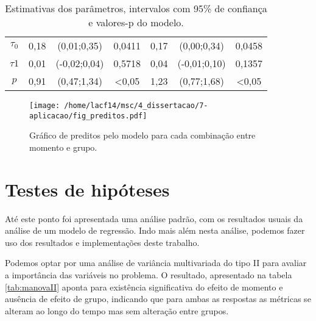 \begin{table}[H]
\begin{tabular}{c|cccccc}
$\tau_0$                   & 0,18       & (0,01;0,35)                                                       & \multicolumn{1}{c|}{0,0411} & 0,17       & (0,00;0,34)                                                       & 0,0458           \\
$\tau1$                    & 0,01       & (-0,02;0,04)                                                      & \multicolumn{1}{c|}{0,5718}           & 0,04       & (-0,01;0,10)                                                      & 0,1357           \\
$p$                        & 0,91       & (0,47;1,34)                                                       & \multicolumn{1}{c|}{\textless 0,05} & 1,23       & (0,77;1,68)                                                       & \textless 0,05 \\ \hline
\end{tabular}
\caption{Estimativas dos parâmetros, intervalos com 95\% de confiança e valores-p do modelo.}
\label{tab:estimativas}
\end{table}

\begin{figure}[H]
\centering
\texttt{[image: /home/lacf14/msc/4\_dissertacao/7-aplicacao/fig\_preditos.pdf]}
\caption{Gráfico de preditos pelo modelo para cada combinação entre momento e grupo.}
\label{fig:preds}
\end{figure}


\section{Testes de hipóteses}

Até este ponto foi apresentada uma análise padrão, com os resultados usuais da análise de um modelo de regressão. Indo mais além nesta análise, podemos fazer uso dos resultados e implementações deste trabalho.

Podemos optar por uma análise de variância multivariada do tipo II para avaliar a importância das variáveis no problema. O resultado, apresentado na tabela \autoref{tab:manovaII} aponta para existência significativa do efeito de momento e ausência de efeito de grupo, indicando que para ambas as respostas as métricas se alteram ao longo do tempo mas sem alteração entre grupos.


